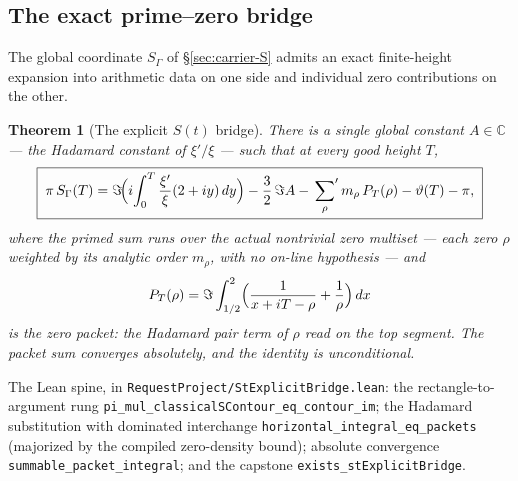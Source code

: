 \documentclass[11pt]{article}
\newtheorem{theorem}{Theorem}
\theoremstyle{definition}
\begin{document}
\subsection{The exact prime--zero bridge}\label{sec:st-bridge}

The global coordinate \(S_\Gamma\) of \S\ref{sec:carrier-S} admits an exact
finite-height expansion into arithmetic data on one side and individual
zero contributions on the other.

\begin{theorem}[The explicit \(S(t)\) bridge]\label{thm:st-explicit-bridge}
There is a single global constant \(A\in\mathbb C\) --- the Hadamard
constant of \(\xi'/\xi\) --- such that at every good height \(T\),
\[
\boxed{\;
\pi\,S_\Gamma(T)
=\Im\!\Bigl(i\!\int_0^T\frac{\xi'}{\xi}(2+iy)\,dy\Bigr)
-\frac32\,\Im A
-\sideset{}{'}\sum_{\rho}m_\rho\,P_T(\rho)
-\vartheta(T)-\pi,\;}
\]
where the primed sum runs over the actual nontrivial zero multiset ---
each zero \(\rho\) weighted by its analytic order \(m_\rho\), with no
on-line hypothesis --- and
\[
P_T(\rho)
=\Im\int_{1/2}^{2}\Bigl(\frac1{x+iT-\rho}+\frac1\rho\Bigr)\,dx
\]
is the zero packet: the Hadamard pair term of \(\rho\) read on the top
segment.  The packet sum converges absolutely, and the identity is
unconditional.
\end{theorem}

The Lean spine, in \texttt{RequestProject/StExplicitBridge.lean}: the
rectangle-to-argument rung
\texttt{pi\_mul\_classicalSContour\_eq\_contour\_im}; the Hadamard
substitution with dominated interchange
\texttt{horizontal\_integral\_eq\_packets} (majorized by the compiled
zero-density bound); absolute convergence
\texttt{summable\_packet\_integral}; and the capstone
\texttt{exists\_stExplicitBridge}.
\end{document}

